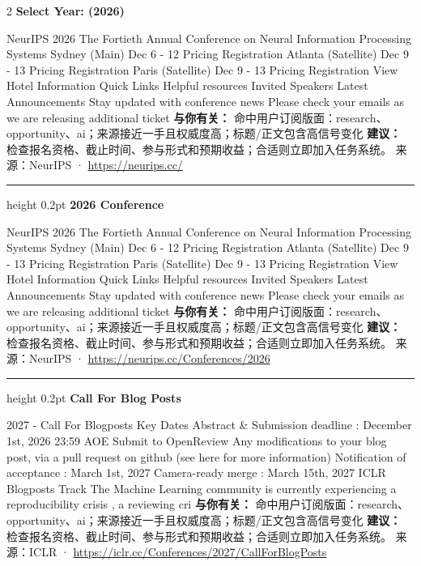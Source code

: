 \documentclass[10.5pt]{ctexart}
\begin{document}
\begin{multicols}{2}
{\large\bfseries Select Year: (2026)}\par
NeurIPS 2026 The Fortieth Annual Conference on Neural Information Processing Systems Sydney (Main) Dec 6 - 12 Pricing Registration Atlanta (Satellite) Dec 9 - 13 Pricing Registration Paris (Satellite) Dec 9 - 13 Pricing Registration View Hotel Information Quick Links Helpful resources Invited Speakers Latest Announcements Stay updated with conference news Please check your emails as we are releasing additional ticket
\textbf{与你有关：} 命中用户订阅版面：research、opportunity、ai；来源接近一手且权威度高；标题/正文包含高信号变化
\textbf{建议：} 检查报名资格、截止时间、参与形式和预期收益；合适则立即加入任务系统。
{\footnotesize\color{ormuted} 来源：NeurIPS · \url{https://neurips.cc/}}
\vspace{2mm}
\hrule height 0.2pt
\vspace{2mm}
{\large\bfseries 2026 Conference}\par
NeurIPS 2026 The Fortieth Annual Conference on Neural Information Processing Systems Sydney (Main) Dec 6 - 12 Pricing Registration Atlanta (Satellite) Dec 9 - 13 Pricing Registration Paris (Satellite) Dec 9 - 13 Pricing Registration View Hotel Information Quick Links Helpful resources Invited Speakers Latest Announcements Stay updated with conference news Please check your emails as we are releasing additional ticket
\textbf{与你有关：} 命中用户订阅版面：research、opportunity、ai；来源接近一手且权威度高；标题/正文包含高信号变化
\textbf{建议：} 检查报名资格、截止时间、参与形式和预期收益；合适则立即加入任务系统。
{\footnotesize\color{ormuted} 来源：NeurIPS · \url{https://neurips.cc/Conferences/2026}}
\vspace{2mm}
\hrule height 0.2pt
\vspace{2mm}
{\large\bfseries Call For Blog Posts}\par
2027 - Call For Blogposts Key Dates Abstract \& Submission deadline : December 1st, 2026 23:59 AOE Submit to OpenReview Any modifications to your blog post, via a pull request on github (see here for more information) Notification of acceptance : March 1st, 2027 Camera-ready merge : March 15th, 2027 ICLR Blogposts Track The Machine Learning community is currently experiencing a reproducibility crisis , a reviewing cri
\textbf{与你有关：} 命中用户订阅版面：research、opportunity、ai；来源接近一手且权威度高；标题/正文包含高信号变化
\textbf{建议：} 检查报名资格、截止时间、参与形式和预期收益；合适则立即加入任务系统。
{\footnotesize\color{ormuted} 来源：ICLR · \url{https://iclr.cc/Conferences/2027/CallForBlogPosts}}

\end{multicols}
\end{document}
